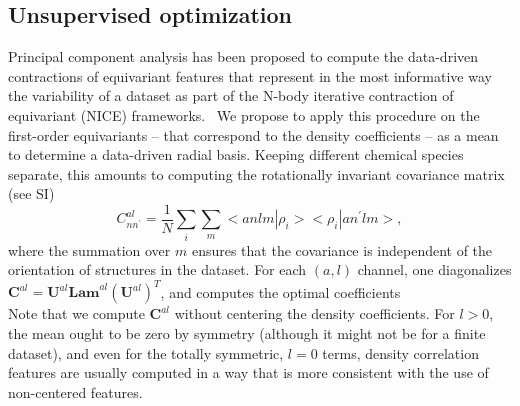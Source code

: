 \subsection{Unsupervised optimization}
Principal component analysis has been proposed to compute the data-driven contractions of equivariant features that represent in the most informative way the variability of a dataset as part of the N-body iterative contraction of equivariant (NICE) frameworks.~\cite{niga+20jcp}
We propose to apply this procedure on the first-order equivariants -- that correspond to the density coefficients -- as a mean to determine a data-driven radial basis. 
Keeping different chemical species separate, this amounts to computing the rotationally invariant covariance matrix (see SI) 
\begin{equation}
C^{al}_{nn^\prime}= \frac{1}{N} \sum_i \sum_m <an l m|\rho_i> <\rho_i|an^\prime lm>,
\label{eq:cov}
\end{equation}
where the summation over $m$ ensures that the covariance is independent of the orientation of structures in the dataset.
For each $(a, l)$ channel, one diagonalizes $\mathbf{C}^{al}=\mathbf{U}^{al} \mathbf{Lam}^{al} (\mathbf{U}^{al})^T$, and computes the optimal coefficients
\begin{equation}
\end{equation}
Note that we compute $\mathbf{C}^{al}$ without centering the density coefficients. For $l>0$, the mean ought to be zero by symmetry (although it might not be for a finite dataset), and even for the totally symmetric, $l=0$ terms, density correlation features are usually computed in a way that is more consistent with the use of non-centered features. 

